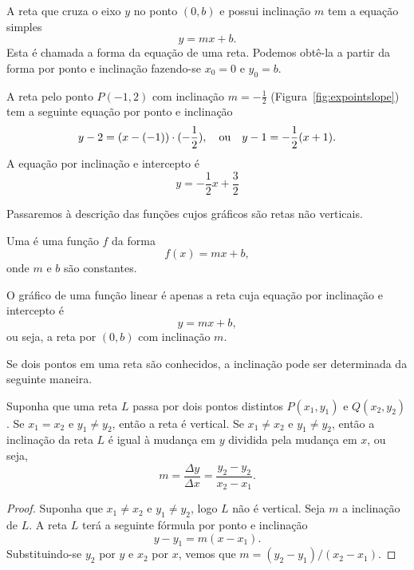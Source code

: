 A reta que cruza o eixo $y$ no ponto $(0, b)$ e possui inclinação $m$
tem a equação simples
\[
  y = mx + b.
\]
Esta é chamada a forma %
%
da equação de uma reta. Podemos obtê-la a partir da forma por
ponto e inclinação fazendo-se $x_0 = 0$ e $y_0 = b$.

\begin{example}
A reta pelo ponto $P(-1, 2)$ com inclinação $m = - \frac{1}{2}$
(Figura~\ref{fig:expointslope}) tem a seguinte equação por
ponto e inclinação
\[
  y-2 = (x - (-1))\cdot(-\frac{1}{2}), \hspace{1em} \text{ou}
  \hspace{1em} y-1 = -\frac{1}{2}(x+1).
\]
A equação por inclinação e intercepto é
\[
  y = -\frac{1}{2}x + \frac{3}{2}
\]
\end{example}


Passaremos à descrição das funções cujos gráficos são retas não verticais.

\begin{defin}
Uma  é uma função $f$ da forma
\[
  f(x) = mx+b,
\]
onde $m$ e $b$ são constantes.
\end{defin}

O gráfico de uma função linear é apenas a reta cuja equação por
inclinação e intercepto é
\[
  y = mx+b,
\]
ou seja, a reta por $(0, b)$ com inclinação $m$.

Se dois pontos em uma reta são conhecidos, a inclinação pode ser
determinada da seguinte maneira.

\begin{theorem}
\label{theo:slope}
Suponha que uma reta $L$ passa por dois pontos distintos $P(x_1, y_1)$
e $Q(x_2, y_2)$. Se $x_1 = x_2$ e $y_1 \ne y_2$, então a reta é vertical.
Se $x_1 \ne x_2$ e $y_1 \ne y_2$, então a inclinação da reta $L$ é
igual à mudança em $y$ dividida pela mudança em $x$, ou seja,
\[
  m = \frac{\Delta y}{\Delta x} = \frac{y_2 - y_2}{x_2 - x_1}.
\]
\end{theorem}

\begin{proof}
Suponha que $x_1 \ne x_2$ e $y_1 \ne y_2$, logo $L$ não é vertical. Seja
$m$ a inclinação de $L$. A reta $L$ terá a seguinte fórmula por ponto e
inclinação
\[
  y - y_1 = m (x-x_1).
\]
Substituindo-se $y_2$ por $y$ e $x_2$ por $x$, vemos que
$m = (y_2 - y_1)/(x_2 - x_1)$.
\end{proof}

